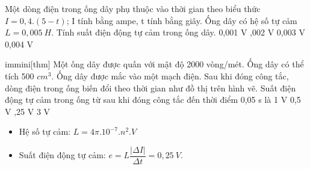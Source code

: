 \begin{vidu}%
Một dòng điện trong ống dây phụ thuộc vào thời gian theo biểu thức $I=0,4.(5-t)$; I tính bằng ampe, t tính bằng giây. Ống dây có hệ số tự cảm $L = 0,005\ H$. Tính suất điện động tự cảm trong ống dây.
\choice
{0,001 V}
{,002 V}
{0,003 V}
{0,004 V}
\end{vidu}
\begin{vidu}%
immini[thm]{
Một ống dây được quấn với mật độ 2000 vòng/mét. Ống dây có thể tích 500 $cm^3$. Ống dây được mắc vào một mạch điện. Sau khi đóng công tắc, dòng điện trong ống biến đổi theo thời gian như đồ thị trên hình vẽ. Suất điện động tự cảm trong ống từ sau khi đóng công tắc đến thời điểm 0,05 s là
\choice
{1 V}
{0,5 V}
{,25 V}
{3 V}}{}
\loigiai
{
\begin{itemize}
\item Hệ số tự cảm: $L = 4\pi .{10^{- 7}}.{n^2}.V$
\item Suất điện động tự cảm: $e = L\dfrac{{\left| {\Delta I} \right|}}{{\Delta t}}=0,25\ V$.
\end{itemize}
}
\end{vidu}

